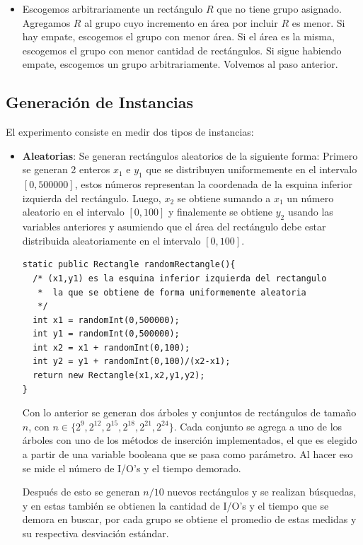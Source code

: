\documentclass[letterpaper,12pt]{article}
\begin{document}
\begin{itemize}
\begin{itemize}
\item Escogemos arbitrariamente un rect\'angulo $R$ que no tiene grupo asignado. Agregamos $R$ al grupo cuyo incremento en \'area por incluir $R$ es menor. Si hay empate, escogemos el grupo con menor \'area. Si el \'area es la misma, escogemos el grupo con menor cantidad de rect\'angulos. Si sigue habiendo empate, escogemos un grupo arbitrariamente. Volvemos al paso anterior.
\end{itemize}
\end{itemize}
\subsection{Generaci\'on de Instancias}

El experimento consiste en medir dos tipos de instancias:
\begin{itemize}
\item \textbf{Aleatorias}: Se generan rect\'angulos aleatorios de la siguiente forma: Primero se generan 2 enteros $x_1$ e $y_1$ que se distribuyen uniformemente en el intervalo $[0,500000]$, estos n\'umeros representan la coordenada de la esquina inferior izquierda del rect\'angulo. Luego, $x_2$ se obtiene sumando a $x_1$ un n\'umero aleatorio en el intervalo $[0,100]$ y finalemente se obtiene $y_2$ usando las variables anteriores y asumiendo que el \'area del rect\'angulo debe estar distribuida aleatoriamente en el intervalo $[0,100]$.

\lstset{language=Java, breaklines=true, basicstyle=\footnotesize}
\begin{lstlisting}[frame=single]
static public Rectangle randomRectangle(){
  /* (x1,y1) es la esquina inferior izquierda del rectangulo
   *  la que se obtiene de forma uniformemente aleatoria
   */
  int x1 = randomInt(0,500000);
  int y1 = randomInt(0,500000);
  int x2 = x1 + randomInt(0,100);
  int y2 = y1 + randomInt(0,100)/(x2-x1);
  return new Rectangle(x1,x2,y1,y2);
}
\end{lstlisting}

Con lo anterior se generan dos \'arboles y conjuntos de rect\'angulos de tama\~no $n$, con $n \in \{2^9,2^{12},2^{15},2^{18},2^{21},2^{24}\}$. Cada conjunto se agrega a uno de los \'arboles con uno de los m\'etodos de inserci\'on implementados, el que es elegido a partir de una variable booleana que se pasa como par\'ametro. Al hacer eso se mide el n\'umero de I/O's y el tiempo demorado.

Despu\'es de esto se generan $n/10$ nuevos rect\'angulos y se realizan b\'usquedas, y en estas tambi\'en se obtienen la cantidad de I/O's y el tiempo que se demora en buscar, por cada grupo se obtiene el promedio de estas medidas y su respectiva desviaci\'on est\'andar.



\end{itemize}
\end{document}
